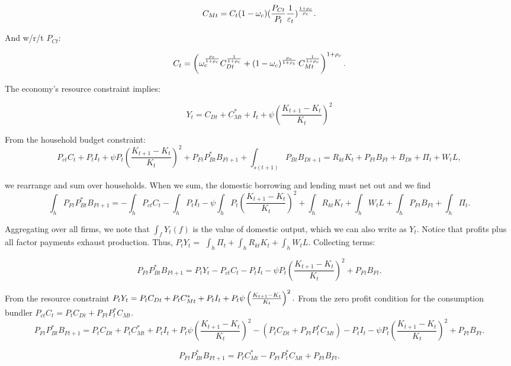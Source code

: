 \documentclass{article}
\begin{document}
\[
C_{Mt}=C_{t}(1-\omega _{c})(\frac{P_{Ct}}{P_{t}}\frac{1}{\varepsilon _{t}})^{%
\frac{1+\rho _{c}}{\rho _{c}}}. 
\]

And w/r/t $P_{Ct}$:

\[
C_{t}=\left( \omega _{c}^{\frac{\rho _{c}}{1+\rho _{c}}}C_{Dt}^{\frac{1}{%
1+\rho _{c}}}+\left( 1-\omega _{c}\right) ^{\frac{\rho _{c}}{1+\rho _{c}}%
}C_{Mt}^{\frac{1}{1+\rho _{c}}}\right) ^{1+\rho _{c}}. 
\]

The economy's resource constraint implies:

\[
Y_{t}=C_{Dt}+C_{Mt}^{\ast }+I_{t}+\psi \left( \frac{K_{t+1}-K_{t}}{K_{t}}%
\right) ^{2} 
\]

\bigskip

From the household budget constraint: 
\[
P_{ct}C_{t}+P_{t}I_{t}+\psi P_{t}\left( \frac{K_{t+1}-K_{t}}{K_{t}}\right)
^{2}+P_{Ft}P_{Bt}^{\ast
}B_{Ft+1}+\int_{s(t+1)}P_{Bt}B_{Dt+1}=R_{kt}K_{t}+P_{Ft}B_{Ft}+B_{Dt}+\Pi
_{t}+W_{t}L, 
\]

we rearrange and sum over households. When we sum, the domestic borrowing
and lending must net out and we find%
\[
\int_{h}P_{Ft}P_{Bt}^{\ast
}B_{Ft+1}=-\int_{h}P_{ct}C_{t}-\int_{h}P_{t}I_{t}-\psi \int_{h}P_{t}\left( 
\frac{K_{t+1}-K_{t}}{K_{t}}\right)
^{2}+\int_{h}R_{kt}K_{t}+\int_{h}W_{t}L+\int_{h}P_{Ft}B_{Ft}+\int_{h}\Pi
_{t}. 
\]

Aggregating over all firms, we note that $\int_{f}Y_{t}(f)$ is the value of
domestic output, which we can also write as $Y_{t}$\bigskip . Notice that
profits plus all factor payments exhaust production. Thus, $P_{t}Y_{t}=$ $%
\int_{h}\Pi _{t}+\int_{h}R_{kt}K_{t}+\int_{h}W_{t}L.$ Collecting terms:

\[
P_{Ft}P_{Bt}^{\ast }B_{Ft+1}=P_{t}Y_{t}-P_{ct}C_{t}-P_{t}I_{t}-\psi
P_{t}\left( \frac{K_{t+1}-K_{t}}{K_{t}}\right) ^{2}+P_{Ft}B_{Ft}. 
\]

\bigskip From the resource constraint $P_{t}Y_{t}=P_{t}C_{Dt}+P_{t}C_{Mt}^{%
\ast }+P_{t}I_{t}+P_{t}\psi \left( \frac{K_{t+1}-K_{t}}{K_{t}}\right) ^{2}.$
From the zero profit condition for the consumption bundler $%
P_{ct}C_{t}=P_{t}C_{Dt}+P_{Ft}P_{t}^{\ast }C_{Mt}$. 
\[
P_{Ft}P_{Bt}^{\ast }B_{Ft+1}=P_{t}C_{Dt}+P_{t}C_{Mt}^{\ast
}+P_{t}I_{t}+P_{t}\psi \left( \frac{K_{t+1}-K_{t}}{K_{t}}\right) ^{2}-\left(
P_{t}C_{Dt}+P_{Ft}P_{t}^{\ast }C_{Mt}\right) -P_{t}I_{t}-\psi P_{t}\left( 
\frac{K_{t+1}-K_{t}}{K_{t}}\right) ^{2}+P_{Ft}B_{Ft}. 
\]

\[
P_{Ft}P_{Bt}^{\ast }B_{Ft+1}=P_{t}C_{Mt}^{\ast }-P_{Ft}P_{t}^{\ast
}C_{Mt}+P_{Ft}B_{Ft}. 
\]
\end{document}
